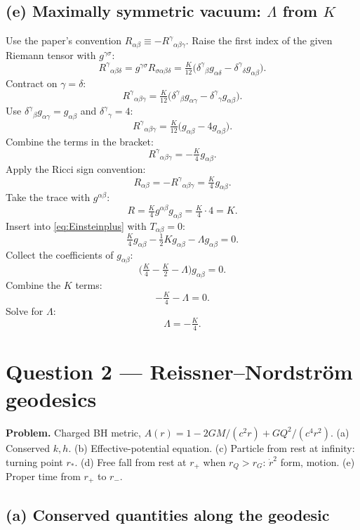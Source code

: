 \documentclass[11pt]{article}
\begin{document}
\subsection*{(e) Maximally symmetric vacuum: $\Lambda$ from $K$}

Use the paper's convention $R_{\alpha\beta}\equiv -R^\gamma{}_{\alpha\beta\gamma}$. Raise the first index of the given Riemann tensor with $g^{\gamma\sigma}$:
\[
R^\gamma{}_{\alpha\beta\delta}=g^{\gamma\sigma}R_{\sigma\alpha\beta\delta}=\tfrac{K}{12}\bigl(\delta^\gamma{}_\beta g_{\alpha\delta}-\delta^\gamma{}_\delta g_{\alpha\beta}\bigr).
\]
Contract on $\gamma=\delta$:
\[
R^\gamma{}_{\alpha\beta\gamma}=\tfrac{K}{12}\bigl(\delta^\gamma{}_\beta g_{\alpha\gamma}-\delta^\gamma{}_\gamma g_{\alpha\beta}\bigr).
\]
Use $\delta^\gamma{}_\beta g_{\alpha\gamma}=g_{\alpha\beta}$ and $\delta^\gamma{}_\gamma=4$:
\[
R^\gamma{}_{\alpha\beta\gamma}=\tfrac{K}{12}\bigl(g_{\alpha\beta}-4g_{\alpha\beta}\bigr).
\]
Combine the terms in the bracket:
\[
R^\gamma{}_{\alpha\beta\gamma}=-\tfrac{K}{4}g_{\alpha\beta}.
\]
Apply the Ricci sign convention:
\[
R_{\alpha\beta}=-R^\gamma{}_{\alpha\beta\gamma}=\tfrac{K}{4}g_{\alpha\beta}.
\]
Take the trace with $g^{\alpha\beta}$:
\[
R=\tfrac{K}{4}g^{\alpha\beta}g_{\alpha\beta}=\tfrac{K}{4}\cdot 4=K.
\]
Insert into \eqref{eq:Einsteinplus} with $T_{\alpha\beta}=0$:
\[
\tfrac{K}{4}g_{\alpha\beta}-\tfrac12 K g_{\alpha\beta}-\Lambda g_{\alpha\beta}=0.
\]
Collect the coefficients of $g_{\alpha\beta}$:
\[
\bigl(\tfrac{K}{4}-\tfrac{K}{2}-\Lambda\bigr)g_{\alpha\beta}=0.
\]
Combine the $K$ terms:
\[
-\tfrac{K}{4}-\Lambda=0.
\]
Solve for $\Lambda$:
\begin{equation}
\boxed{\ \Lambda=-\tfrac{K}{4}.\ }
\label{eq:Lambdabox}
\end{equation}

\section*{Question 2 --- Reissner--Nordstr\"om geodesics}

\textbf{Problem.} Charged BH metric, $A(r)=1-2GM/(c^2r)+GQ^2/(c^4r^2)$. (a) Conserved $k,h$. (b) Effective-potential equation. (c) Particle from rest at infinity: turning point $r_*$. (d) Free fall from rest at $r_+$ when $r_Q>r_G$: $\dot r^2$ form, motion. (e) Proper time from $r_+$ to $r_-$.

\subsection*{(a) Conserved quantities along the geodesic}
\end{document}
